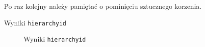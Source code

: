 Po raz kolejny należy pamiętać o pominięciu sztucznego korzenia.





\begin{table}[h!]
  \caption{Wyniki \texttt{hierarchyid}}
  \begin{center}
  \end{center}
\end{table}

\begin{figure}[h!t]
  \caption{Wyniki \texttt{hierarchyid}}
  \label{fig:img_chart_simple}
  \begin{center}
  \end{center}
\end{figure}


%
%
%












